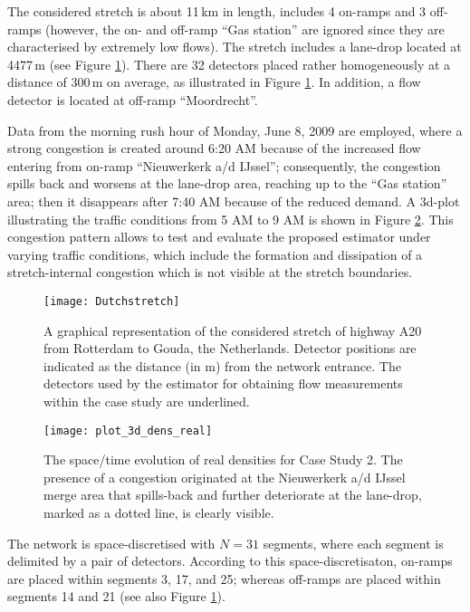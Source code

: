 \documentclass[titlepage,oneside,fleqn,12pt]{article}
\begin{document}
The considered stretch is about 11\,km in length, includes 4 on-ramps and 3 off-ramps (however, the on- and off-ramp ``Gas station'' are ignored since they are characterised by extremely low flows). The stretch includes a lane-drop located at 4477\,m (see Figure \ref{fig:dutchStretch}). There are 32 detectors placed rather homogeneously at a distance of 300\,m on average, as illustrated in Figure \ref{fig:dutchStretch}. In addition, a flow detector is located at off-ramp ``Moordrecht''.

Data from the morning rush hour of Monday, June 8, 2009 are employed, where a strong congestion is created around 6:20 AM because of the increased flow entering from on-ramp ``Nieuwerkerk a/d IJssel''; consequently, the congestion spills back and worsens at the lane-drop area, reaching up to the ``Gas station'' area; then it disappears after 7:40 AM because of the reduced demand. A 3d-plot illustrating the traffic conditions from 5 AM to 9 AM is shown in Figure \ref{fig:3d-dens_real}. This congestion pattern allows to test and evaluate the proposed estimator under varying traffic conditions, which include the formation and dissipation of a stretch-internal congestion which is not visible at the stretch boundaries.

\begin{figure}
\begin{center}
	\texttt{[image: Dutchstretch]}
	\caption{A graphical representation of the considered stretch of highway A20 from Rotterdam to Gouda, the Netherlands. Detector positions are indicated as the distance (in m) from the network entrance. The detectors used by the estimator for obtaining flow measurements within the case study are underlined.} 
	\label{fig:dutchStretch}
\end{center}
\end{figure}

\begin{figure}
\begin{center}
	\texttt{[image: plot\_3d\_dens\_real]}
	\caption{The space/time evolution of real densities for Case Study 2. The presence of a congestion originated at the Nieuwerkerk a/d IJssel merge area that spills-back and further deteriorate at the lane-drop, marked as a dotted line, is clearly visible.} 
	\label{fig:3d-dens_real}
\end{center}
\end{figure}

The network is space-discretised with $N=31$ segments, where each segment is delimited by a pair of detectors. According to this space-discretisaton, on-ramps are placed within segments 3, 17, and 25; whereas off-ramps are placed within segments 14 and 21 (see also Figure \ref{fig:dutchStretch}).
\end{document}
